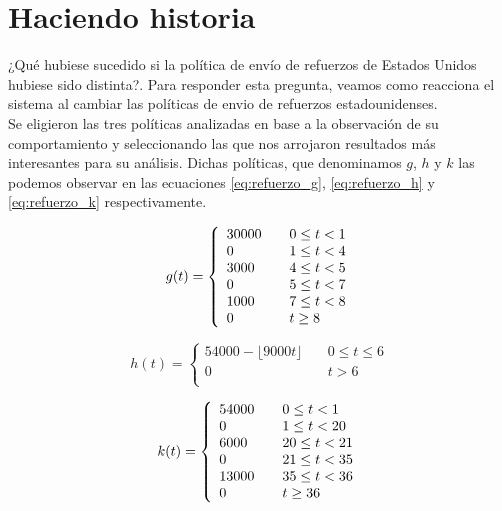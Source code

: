 \documentclass{sig-alternate}
\begin{document}
\newpage

\section{Haciendo historia}

¿Qué hubiese sucedido si la política de envío de refuerzos de Estados Unidos hubiese sido distinta?. Para responder esta pregunta, veamos como
reacciona el sistema al cambiar las políticas de envio de refuerzos estadounidenses.\\
Se eligieron las tres políticas analizadas en base a la observación de su comportamiento y seleccionando las que nos arrojaron resultados
más interesantes para su análisis. Dichas políticas, que denominamos $g$, $h$ y $k$ las podemos observar en las ecuaciones \eqref{eq:refuerzo_g}, 
\eqref{eq:refuerzo_h} y \eqref{eq:refuerzo_k} respectivamente.

\begin{equation}
g(t) = \left\{ 
    \begin{array}{l l}
    30000 & \quad 0 \leq t < 1 \\
    0 & \quad 1 \leq t < 4\\
    3000 & \quad 4 \leq t < 5\\
    0 & \quad 5 \leq t < 7\\
    1000 & \quad 7 \leq t < 8\\
    0 & \quad t \geq 8\\
    \end{array} \right.
\label{eq:refuerzo_g}
\end{equation}

\begin{equation}
h(t) = \left\{ 
    \begin{array}{ll}
    54000 - \lfloor 9000t \rfloor & \quad 0 \leq t \leq 6 \\
    0 & \quad t > 6\\
    \end{array} \right.
\label{eq:refuerzo_h}
\end{equation}

\begin{equation}
k(t) = \left\{ 
    \begin{array}{l l}
    54000 & \quad 0 \leq t < 1 \\
    0 & \quad 1 \leq t < 20\\
    6000 & \quad 20 \leq t < 21\\
    0 & \quad 21 \leq t < 35\\
    13000 & \quad 35 \leq t < 36\\
    0 & \quad t \geq 36\\
    \end{array} \right.
\label{eq:refuerzo_k}
\end{equation}
\end{document}
